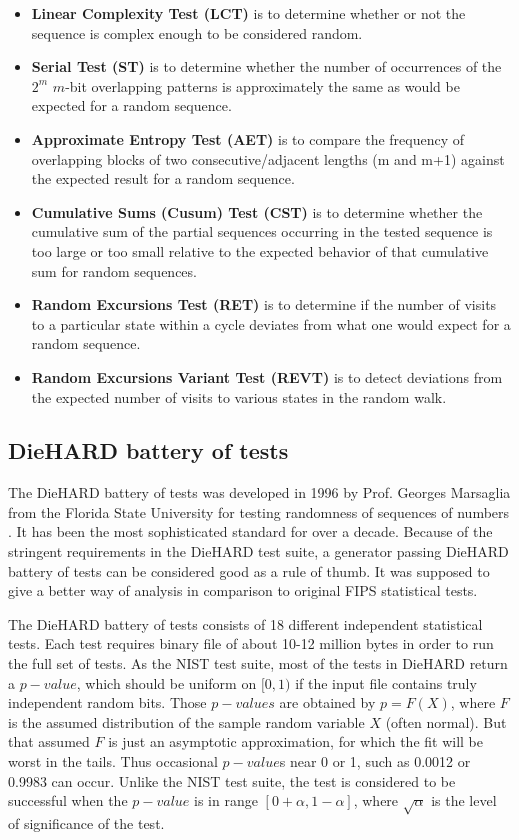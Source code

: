 \begin{itemize}
\item \textbf{Linear Complexity Test (LCT)} is to determine whether or not the sequence is complex enough to be considered random.

\item \textbf{Serial Test (ST)} is to determine whether the number of occurrences of the $2^{m}$ $m$-bit
overlapping patterns is approximately the same as would be expected for a random sequence.

\item \textbf{Approximate Entropy Test (AET)} is to compare the frequency of overlapping blocks of two consecutive/adjacent lengths (m and m+1) against the expected result for a random sequence.%

\item \textbf{Cumulative Sums (Cusum) Test (CST)} is to determine whether the cumulative sum of the partial sequences occurring in the tested sequence is too large or too small relative to the expected behavior of that cumulative sum for random sequences.

\item \textbf{Random Excursions Test (RET)} is to determine if the number of visits to a particular state within a cycle deviates from what one would expect for a random
sequence.

\item \textbf{Random Excursions Variant Test (REVT)} is to detect deviations from the expected number
of visits to various states in the random walk.
\end{itemize}

\subsection{DieHARD battery of tests}
The DieHARD battery of tests was developed in 1996 by Prof. Georges Marsaglia
from the Florida State University for testing randomness of sequences of numbers \cite{Marsaglia1996}. 
It has been the most sophisticated standard for over a decade. Because of the stringent requirements in the DieHARD test suite, a generator passing DieHARD battery of 
tests can be considered good as a rule of thumb. It was supposed to give a better way of analysis in comparison to original FIPS statistical tests.

The DieHARD battery of tests consists of 18 different independent statistical tests. 
Each test requires binary file of about 10-12 million bytes in order to run the full set of tests. 
As the NIST test suite, most of the tests in DieHARD return a $p-value$, which should be uniform on $[0,1)$ if the input file 
contains truly independent random bits. Those $p-values$ are obtained by
$p=F(X)$, where $F$ is the assumed distribution of the sample random variable $X$ (often normal). 
But that assumed $F$ is just an asymptotic approximation, for which the fit will be worst 
in the tails. Thus occasional $p-value$s near 0 or 1, such as 0.0012 or 0.9983 can occur. Unlike the NIST test suite, the test is considered to be successful when
the $p-value$ is in range $[0 + \alpha , 1 -\alpha ]$,
where $\sqrt{\alpha}$ is the level of significance of the test.

